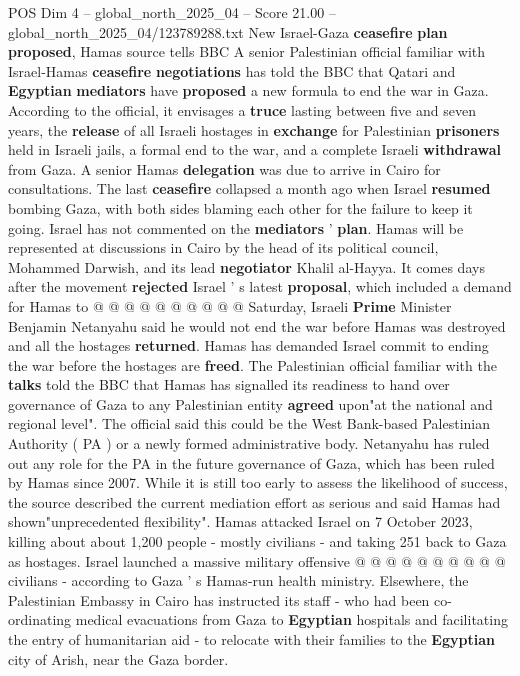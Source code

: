 \begin{textsample}{POS Dim 4 – global\_north\_2025\_04 – Score 21.00 – global\_north\_2025\_04/123789288.txt}  \label{ex:f4_pos_227}
New Israel-Gaza \textbf{ceasefire} \textbf{plan} \textbf{proposed}, Hamas source tells BBC A senior Palestinian official familiar with Israel-Hamas \textbf{ceasefire} \textbf{negotiations} has told the BBC that Qatari and \textbf{Egyptian} \textbf{mediators} have \textbf{proposed} a new formula to end the war in Gaza.
According to the official, it envisages a \textbf{truce} lasting between five and seven years, the \textbf{release} of all Israeli hostages in \textbf{exchange} for Palestinian \textbf{prisoners} held in Israeli jails, a formal end to the war, and a complete Israeli \textbf{withdrawal} from Gaza.
A senior Hamas \textbf{delegation} was due to arrive in Cairo for consultations.
The last \textbf{ceasefire} collapsed a month ago when Israel \textbf{resumed} bombing Gaza, with both sides blaming each other for the failure to keep it going.
Israel has not commented on the \textbf{mediators} ' \textbf{plan}.
Hamas will be represented at discussions in Cairo by the head of its political council, Mohammed Darwish, and its lead \textbf{negotiator} Khalil al-Hayya.
It comes days after the movement \textbf{rejected} Israel ' s latest \textbf{proposal}, which included a demand for Hamas to @ @ @ @ @ @ @ @ @ @ Saturday, Israeli \textbf{Prime} Minister Benjamin Netanyahu said he would not end the war before Hamas was destroyed and all the hostages \textbf{returned}.
Hamas has demanded Israel commit to ending the war before the hostages are \textbf{freed}.
The Palestinian official familiar with the \textbf{talks} told the BBC that Hamas has signalled its readiness to hand over governance of Gaza to any Palestinian entity \textbf{agreed} upon"at the national and regional level".
The official said this could be the West Bank-based Palestinian Authority ( PA ) or a newly formed administrative body.
Netanyahu has ruled out any role for the PA in the future governance of Gaza, which has been ruled by Hamas since 2007.
While it is still too early to assess the likelihood of success, the source described the current mediation effort as serious and said Hamas had shown"unprecedented flexibility".
Hamas attacked Israel on 7 October 2023, killing about about 1,200 people - mostly civilians - and taking 251 back to Gaza as hostages.
Israel launched a massive military offensive @ @ @ @ @ @ @ @ @ @ civilians - according to Gaza ' s Hamas-run health ministry.
Elsewhere, the Palestinian Embassy in Cairo has instructed its staff - who had been co-ordinating medical evacuations from Gaza to \textbf{Egyptian} hospitals and facilitating the entry of humanitarian aid - to relocate with their families to the \textbf{Egyptian} city of Arish, near the Gaza border.

\end{textsample}
